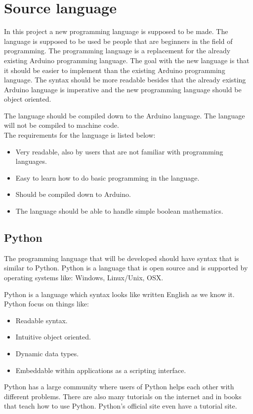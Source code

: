 \section{Source language}
In this project a new programming language is supposed to be made. The language is supposed to be used be people that are beginners in the field of programming. The programming language is a replacement for the already existing Arduino programming language. 
The goal with the new language is that it should be easier to implement than the existing Arduino programming language. The syntax should be more readable besides that the already existing Arduino language is imperative and the new programming language should be object oriented. 

The language should be compiled down to the Arduino language. The language will not be compiled to machine code. \\

The requirements for the language is listed below:
\begin{itemize}
	\item Very readable, also by users that are not familiar with programming languages.
	\item Easy to learn how to do basic programming in the language.
	\item Should be compiled down to Arduino.
	\item The language should be able to handle simple boolean mathematics.
\end{itemize}

\subsection{Python}
The programming language that will be developed should have syntax that is similar to Python. Python is a language that is open source and is supported by operating systems like: Windows, Linux/Unix, OSX.

Python is a language which syntax looks like written English as we know it.
Python focus on things like:

\begin{itemize}
	\item Readable syntax.
	\item Intuitive object oriented.
	\item Dynamic data types.
	\item Embeddable within applications as a scripting interface.
\end{itemize} 
\cite{python:official:about}
Python has a large community where users of Python helps each other with different problems. There are also many tutorials on the internet and in books that teach how to use Python. Python's official site even have a tutorial site.\cite{python:official:tutorial}
